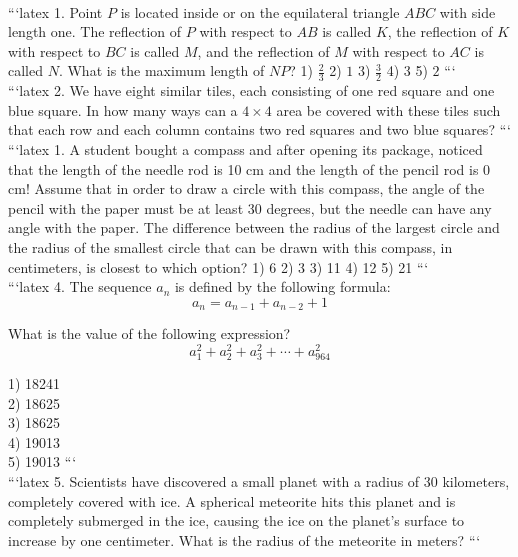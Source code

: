 \\
```latex
1. Point $P$ is located inside or on the equilateral triangle $ABC$ with side length one. The reflection of $P$ with respect to $AB$ is called $K$, the reflection of $K$ with respect to $BC$ is called $M$, and the reflection of $M$ with respect to $AC$ is called $N$. What is the maximum length of $NP$? 
1) $\frac{2}{3}$  2) $1$  3) $\frac{3}{2}$  4) $3$  5) $2$
```
\\
```latex
2. We have eight similar tiles, each consisting of one red square and one blue square. In how many ways can a $4 \times 4$ area be covered with these tiles such that each row and each column contains two red squares and two blue squares?
```
\\
```latex
1. A student bought a compass and after opening its package, noticed that the length of the needle rod is 10 cm and the length of the pencil rod is 0 cm! Assume that in order to draw a circle with this compass, the angle of the pencil with the paper must be at least 30 degrees, but the needle can have any angle with the paper. The difference between the radius of the largest circle and the radius of the smallest circle that can be drawn with this compass, in centimeters, is closest to which option? 
1) 6 2) 3 3) 11 4) 12 5) 21
```
\\
```latex
4. The sequence $a_n$ is defined by the following formula: 
$$a_n = a_{n-1} + a_{n-2} + 1$$

What is the value of the following expression? 
$$a_1^2 + a_2^2 + a_3^2 + \cdots + a_{964}^2$$

1) 18241 \\
2) 18625 \\
3) 18625 \\
4) 19013 \\
5) 19013
```
\\
```latex
5. Scientists have discovered a small planet with a radius of 30 kilometers, completely covered with ice. A spherical meteorite hits this planet and is completely submerged in the ice, causing the ice on the planet's surface to increase by one centimeter. What is the radius of the meteorite in meters?
```
\\

